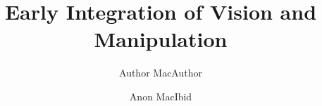 \documentclass[]{article}
\begin{document}
 

\onecolumn



\title{Early Integration of Vision and Manipulation}

\author{Author MacAuthor \and Anon MacIbid}



\maketitle

\ifdraft
  \thispagestyle{plain}
  \pagestyle{plain}
\fi






















\end{document}
